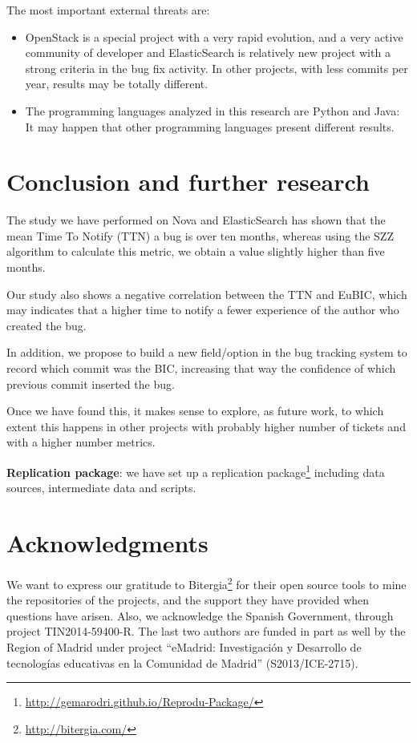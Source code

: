 \documentclass[10pt, conference]{IEEEtran}
\begin{document}
The most important external threats are:

\begin{itemize}
    \item OpenStack is a special project with a very rapid evolution, and a very active community of developer and ElasticSearch is relatively new project with a strong criteria in the bug fix activity. In other projects, with less commits per year, results may be totally different.
    \item The programming languages analyzed in this research are Python and Java: It may happen that other programming languages present different results.
\end{itemize}

\section{Conclusion and further research}
\label{sec:conclusions}

The study we have performed on Nova and ElasticSearch has shown that the mean Time To Notify (TTN) a bug is over ten months, whereas using the SZZ algorithm to calculate this metric, we obtain a value slightly higher than five months.

Our study also shows a negative correlation between the TTN and EuBIC, which may indicates that a higher time to notify a fewer experience of the author who created the bug. 

In addition, we propose to build a new field/option in the bug tracking system to record which commit was the BIC, increasing that way the confidence of which previous commit inserted the bug.

Once we have found this, it makes sense to explore, as future work, to which extent this happens in other projects with probably higher number of tickets and with a higher number metrics.

\textbf{Replication package}: we have set up a replication package\footnote{\url{http://gemarodri.github.io/Reprodu-Package/}} including data sources, intermediate data and scripts.


\section*{Acknowledgments}

We want to express our gratitude to Bitergia\footnote{\url{http://bitergia.com/}} for their open source tools to mine the repositories of the projects, and the support they have provided when questions have arisen. Also, we acknowledge the Spanish Government, through project TIN2014-59400-R. The last two authors are funded in part as well by the Region of Madrid under project ``eMadrid: Investigación y Desarrollo de tecnologías educativas en la Comunidad de Madrid'' (S2013/ICE-2715).
\end{document}
